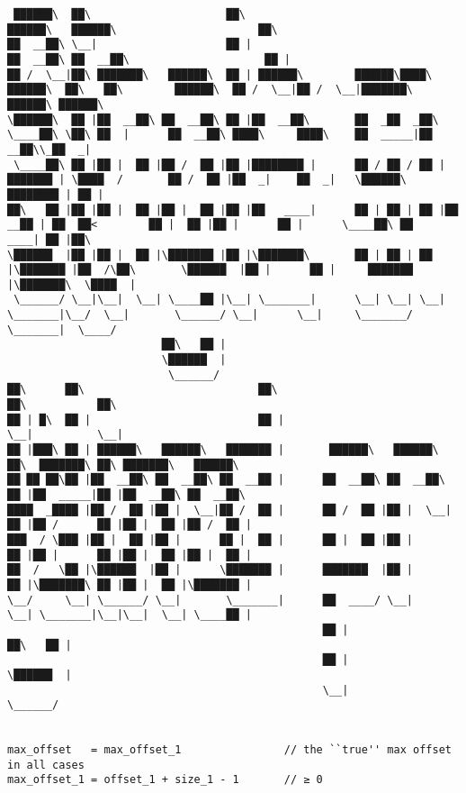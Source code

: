 \documentclass[varwidth=\maxdimen,margin=0.5cm,multi={verbatim}]{standalone}
\begin{document}
\begin{verbatim}
 ██████\  ██\                     ██\                                                                    ██████\   ██████\                      ██\
██  __██\ \__|                    ██ |                                                                  ██  __██\ ██  __██\                     ██ |
██ /  \__|██\ ███████\   ██████\  ██ | ██████\        ██████\████\   ██████\  ██\   ██\        ██████\  ██ /  \__|██ /  \__|███████\  ██████\ ██████\
\██████\  ██ |██  __██\ ██  __██\ ██ |██  __██\       ██  _██  _██\  \____██\ \██\ ██  |      ██  __██\ ████\     ████\    ██  _____|██  __██\\_██  _|
 \____██\ ██ |██ |  ██ |██ /  ██ |██ |████████ |      ██ / ██ / ██ | ███████ | \████  /       ██ /  ██ |██  _|    ██  _|   \██████\  ████████ | ██ |
██\   ██ |██ |██ |  ██ |██ |  ██ |██ |██   ____|      ██ | ██ | ██ |██  __██ | ██  ██<        ██ |  ██ |██ |      ██ |      \____██\ ██   ____| ██ |██\
\██████  |██ |██ |  ██ |\███████ |██ |\███████\       ██ | ██ | ██ |\███████ |██  /\██\       \██████  |██ |      ██ |     ███████  |\███████\  \████  |
 \______/ \__|\__|  \__| \____██ |\__| \_______|      \__| \__| \__| \_______|\__/  \__|       \______/ \__|      \__|     \_______/  \_______|  \____/
                        ██\   ██ |
                        \██████  |
                         \______/
██\      ██\                           ██\                           ██\           ██\
██ | █\  ██ |                          ██ |                          \__|          \__|
██ |███\ ██ | ██████\   ██████\   ███████ |       ██████\   ██████\  ██\  ███████\ ██\ ███████\   ██████\
██ ██ ██\██ |██  __██\ ██  __██\ ██  __██ |      ██  __██\ ██  __██\ ██ |██  _____|██ |██  __██\ ██  __██\
████  _████ |██ /  ██ |██ |  \__|██ /  ██ |      ██ /  ██ |██ |  \__|██ |██ /      ██ |██ |  ██ |██ /  ██ |
███  / \███ |██ |  ██ |██ |      ██ |  ██ |      ██ |  ██ |██ |      ██ |██ |      ██ |██ |  ██ |██ |  ██ |
██  /   \██ |\██████  |██ |      \███████ |      ███████  |██ |      ██ |\███████\ ██ |██ |  ██ |\███████ |
\__/     \__| \______/ \__|       \_______|      ██  ____/ \__|      \__| \_______|\__|\__|  \__| \____██ |
                                                 ██ |                                            ██\   ██ |
                                                 ██ |                                            \██████  |
                                                 \__|                                             \______/


max_offset   = max_offset_1                // the ``true'' max offset in all cases
max_offset_1 = offset_1 + size_1 - 1       // ≥ 0


\end{verbatim}
\end{document}
